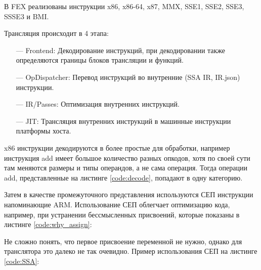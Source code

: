 В FEX реализованы инструкции x86, x86-64, x87, MMX, SSE1, SSE2, SSE3, SSSE3 и BMI. 

Трансляция происходит в 4 этапа:

\begin{itemize}[leftmargin=1.6\parindent]
	\item[---] Frontend: Декодирование инструкций, при декодировании также определяются границы блоков трансляции и функций.
	\item[---] OpDispatcher: Перевод инструкций во внутренние (SSA IR, IR.json) инструкции.
	\item[---] IR/Passes: Оптимизация внутренних инструкций.
	\item[---] JIT: Трансляция внутренних инструкций в машинные инструкции платформы хоста.
\end{itemize}

x86 инструкции декодируются в более простые для обработки, например инструкция add имеет большое количество разных опкодов, хотя по своей сути там меняются размеры и типы операндов, а не сама операция. Тогда операции add, представленные на листинге \ref{code:decode}, попадают в одну категорию.


Затем в качестве промежуточного представления используются СЕП инструкции напоминающие ARM. Использование СЕП облегчает оптимизацию кода, например, при устранении бессмысленных присвоений, которые показаны в листинге \ref{code:why_assign}:

Не сложно понять, что первое присвоение переменной не нужно, однако для транслятора это далеко не так очевидно. Пример использования СЕП на листинге \ref{code:SSA}:


